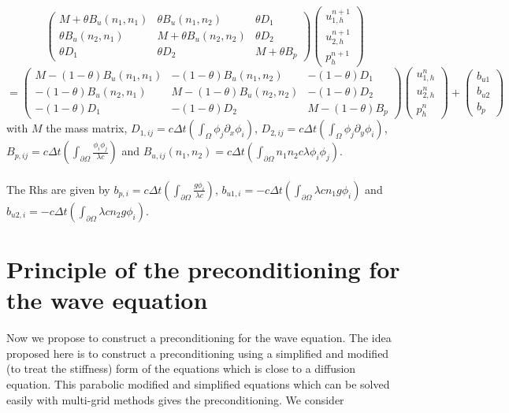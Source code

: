 \documentclass[a4paper,twoside,french,english,11pt]{article}
\newcommand{\dy}{\partial_y}
\newcommand{\dx}{\partial_x}
\begin{document}
$$
\left(\begin{array}{lll}
M + \theta B_{u}(n_1,n_1) & \theta B_{u}(n_1,n_2) & \theta D_1 \\
\theta B_{u}(n_2,n_1)  & M +\theta B_{u}(n_2,n_2) & \theta D_2 \\
 \theta D_1 & \theta D_2  & M+ \theta B_p
\end{array}\right)\left(\begin{array}{l} u_{1,h}^{n+1} \\ u_{2,h}^{n+1}\\ p_h^{n+1}  \end{array}\right)
$$
$$
=\left(\begin{array}{lll}
M - (1- \theta )B_{u}(n_1,n_1) &  - (1- \theta ) B_{u}(n_1,n_2)  &  - (1- \theta )D_1 \\
 - (1- \theta ) B_{u}(n_2,n_1)  & M - (1- \theta ) B_{u}(n_2,n_2) &  - (1- \theta )D_2  \\
  - (1- \theta ) D_1 & - (1- \theta )D_2 & M - (1- \theta ) B_p
\end{array}\right)\left(\begin{array}{l} u_{1,h}^{n} \\ u_{2,h}^{n} \\ p_h^{n} \end{array}\right)+\left(\begin{array}{l} b_{u1} \\ b_{u2} \\b_{p} \end{array}\right)
$$
with $M$ the mass matrix, $D_{1,ij}=c \Delta t\left(\int_{\Omega} \phi_j\dx \phi_i\right)$, $D_{2,ij}=c \Delta t\left(\int_{\Omega} \phi_j\dy \phi_i\right)$, $B_{p,ij}=c\Delta t\left(\int_{\partial \Omega} \frac{\phi_i \phi_j}{\lambda c}\right)$ and $B_{u,ij}(n_1,n_2)=c\Delta t\left(\int_{\partial \Omega} n_1n_2 c\lambda\phi_i \phi_j\right)$. \\\\
The Rhs are given by $b_{p,i}=c\Delta t\left(\int_{\partial \Omega} \frac{g\phi_i }{\lambda c}\right)$, $b_{u1,i}=-c\Delta t\left(\int_{\partial \Omega} \lambda c n_1 g\phi_i \right)$ and $b_{u2,i}=-c\Delta t\left(\int_{\partial \Omega} \lambda c n_2 g\phi_i\right)$.
\section{Principle of the preconditioning for the wave equation}
Now we propose to construct a preconditioning for the wave equation.
The idea proposed here is to construct a preconditioning  using a simplified and modified (to treat the stiffness) form of the equations which is close to a diffusion equation. This parabolic modified and simplified equations which can be solved easily with multi-grid methods gives the preconditioning. We consider
\end{document}
